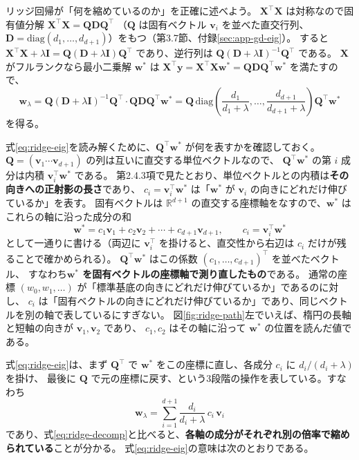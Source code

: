 リッジ回帰が「何を縮めているのか」を正確に述べよう。
$\bm{X}^\top\bm{X}$ は対称なので固有値分解 $\bm{X}^\top\bm{X} = \bm{Q}\bm{D}\bm{Q}^\top$
（$\bm{Q}$ は固有ベクトル $\bm{v}_i$ を並べた直交行列、$\bm{D} = \mathrm{diag}(d_1, \ldots, d_{d+1})$）をもつ（第3.7節、付録\ref{sec:app-gd-eig}）。
すると $\bm{X}^\top\bm{X} + \lambda\bm{I} = \bm{Q}(\bm{D} + \lambda\bm{I})\bm{Q}^\top$ であり、逆行列は
$\bm{Q}(\bm{D} + \lambda\bm{I})^{-1}\bm{Q}^\top$ である。
$\bm{X}$ がフルランクなら最小二乗解 $\bm{w}^*$ は $\bm{X}^\top\bm{y} = \bm{X}^\top\bm{X}\bm{w}^* = \bm{Q}\bm{D}\bm{Q}^\top\bm{w}^*$ を満たすので、
\begin{equation}
  \bm{w}_\lambda = \bm{Q}(\bm{D} + \lambda\bm{I})^{-1}\bm{Q}^\top \cdot \bm{Q}\bm{D}\bm{Q}^\top\bm{w}^*
  = \bm{Q}\,\mathrm{diag}\!\left( \frac{d_1}{d_1 + \lambda}, \ldots, \frac{d_{d+1}}{d_{d+1} + \lambda} \right)\bm{Q}^\top\bm{w}^*
  \label{eq:ridge-eig}
\end{equation}
を得る。

式\eqref{eq:ridge-eig}を読み解くために、$\bm{Q}^\top\bm{w}^*$ が何を表すかを確認しておく。
$\bm{Q} = (\bm{v}_1 \cdots \bm{v}_{d+1})$ の列は互いに直交する単位ベクトルなので、
$\bm{Q}^\top\bm{w}^*$ の第 $i$ 成分は内積 $\bm{v}_i^\top\bm{w}^*$ である。
第2.4.3項で見たとおり、単位ベクトルとの内積は\textbf{その向きへの正射影の長さ}であり、
$c_i = \bm{v}_i^\top\bm{w}^*$ は「$\bm{w}^*$ が $\bm{v}_i$ の向きにどれだけ伸びているか」を表す。
固有ベクトルは $\mathbb{R}^{d+1}$ の直交する座標軸をなすので、$\bm{w}^*$ はこれらの軸に沿った成分の和
\begin{equation}
  \bm{w}^* = c_1\bm{v}_1 + c_2\bm{v}_2 + \cdots + c_{d+1}\bm{v}_{d+1}, \qquad c_i = \bm{v}_i^\top\bm{w}^*
  \label{eq:ridge-decomp}
\end{equation}
として一通りに書ける（両辺に $\bm{v}_i^\top$ を掛けると、直交性から右辺は $c_i$ だけが残ることで確かめられる）。
$\bm{Q}^\top\bm{w}^*$ はこの係数 $(c_1, \ldots, c_{d+1})^\top$ を並べたベクトル、
すなわち\textbf{$\bm{w}^*$ を固有ベクトルの座標軸で測り直したもの}である。
通常の座標 $(w_0, w_1, \ldots)$ が「標準基底の向きにどれだけ伸びているか」であるのに対し、
$c_i$ は「固有ベクトルの向きにどれだけ伸びているか」であり、同じベクトルを別の軸で表しているにすぎない。
図\ref{fig:ridge-path}左でいえば、楕円の長軸と短軸の向きが $\bm{v}_1, \bm{v}_2$ であり、
$c_1, c_2$ はその軸に沿って $\bm{w}^*$ の位置を読んだ値である。

式\eqref{eq:ridge-eig}は、まず $\bm{Q}^\top$ で $\bm{w}^*$ をこの座標に直し、各成分 $c_i$ に $d_i/(d_i + \lambda)$ を掛け、
最後に $\bm{Q}$ で元の座標に戻す、という3段階の操作を表している。すなわち
\begin{equation}
  \bm{w}_\lambda = \sum_{i=1}^{d+1} \frac{d_i}{d_i + \lambda}\, c_i\, \bm{v}_i
  \label{eq:ridge-eig-sum}
\end{equation}
であり、式\eqref{eq:ridge-decomp}と比べると、\textbf{各軸の成分がそれぞれ別の倍率で縮められている}ことが分かる。
式\eqref{eq:ridge-eig}の意味は次のとおりである。

